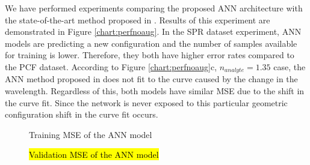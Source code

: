 \documentclass[journal]{IEEEtran}
\begin{document}
We have performed experiments comparing the proposed ANN architecture with the state-of-the-art method proposed in \cite{paper0}. Results of this experiment are demonstrated in Figure \ref{chart:perfnoaug}. In the SPR dataset experiment, ANN models are predicting a new configuration and the number of samples available for training is lower. Therefore, they both have higher error rates compared to the PCF dataset. According to Figure \ref{chart:perfnoaug}c, $n_{analyte} = 1.35$ case, the ANN method proposed in \cite{paper0} does not fit to the curve caused by the change in the wavelength. 
Regardless of this, both models have similar MSE due to the shift in the curve fit. Since the network is never exposed to this particular geometric configuration shift in the curve fit occurs.

\begin{figure}
	\begin{subfigure}{.48\textwidth}
		\centering
	\end{subfigure}	
	
	
	\caption{Training MSE of the ANN model}
	\label{chart:trainingmse}
\end{figure}

\begin{figure}
	\begin{subfigure}{.48\textwidth}
		\centering
	\end{subfigure}	
	
	
	\caption{\hl{Validation MSE of the ANN model}}
	\label{chart:validationmse}
\end{figure}
\end{document}
